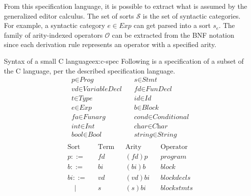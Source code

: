 \documentclass{article}
\begin{document}
From this specification language, it is possible to extract what is assumed by the generalized editor calculus\cite{aalborg}. The set of sorts $\mathcal{S}$ is the set of syntactic categories. For example, a syntactic category $e \in Exp$ can get parsed into a sort $s_{e}$.
The family of arity-indexed operators $\mathcal{O}$ can be extracted from the BNF notation since each derivation rule represents an operator with a specified arity.

\begin{example}{Syntax of a small C language}{ex:c-spec}
Following is a specification of a subset of the C language\cite{c-iso-standard}, per the described specification language.
\[
\begin{aligned}
&\textit{p}         \in \textit{Prog}           \quad &\textit{s}           \in \textit{Stmt}       \\
&\textit{vd}        \in \textit{VariableDecl}   \quad &\textit{fd}        \in \textit{FunDecl} \\
&\textit{t}         \in \textit{Type}           \quad &\textit{id}          \in \textit{Id}         \\
&\textit{e}         \in \textit{Exp}            \quad &\textit{b}           \in \textit{Block}      \\
&\textit{fa}        \in \textit{Funarg}         \quad &\textit{cond}      \in \textit{Conditional}    \\
&\textit{int}       \in \textit{Int}            \quad &\textit{char}        \in \textit{Char}       \\
&\textit{bool}       \in \textit{Bool}          \quad &\textit{string}        \in \textit{String}       \\
\end{aligned}
\]
\[
\begin{aligned}
&\text{Sort}&   & \text{Term}&                                      &\text{Arity}&                  & \text{Operator}               \\
&p ::=      &   & \textit{fd}&                                      &(fd)p       &                  &program                \\
&b ::=      &   & \text{$bi$}&                                      &(bi)b       &                  &block                \\
&bi ::=      &   &\text{$vd$}&                                      &(vd)bi       &                 &blockdecls                \\
&\quad |     &  & \text{$s$}&                                       &(s)bi       &                  &blockstmts                \\

\end{aligned}\]
\end{example}
\end{document}
